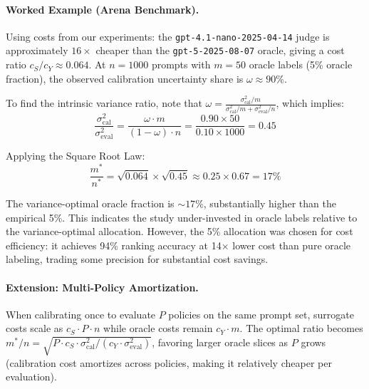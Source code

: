 \paragraph{Worked Example (Arena Benchmark).}
Using costs from our experiments: the \texttt{gpt-4.1-nano-2025-04-14} judge is approximately $16\times$ cheaper than the \texttt{gpt-5-2025-08-07} oracle, giving a cost ratio $c_S/c_Y \approx 0.064$. At $n=1000$ prompts with $m=50$ oracle labels (5\% oracle fraction), the observed calibration uncertainty share is $\omega \approx 90\%$.

To find the intrinsic variance ratio, note that $\omega = \frac{\sigma^2_{\mathrm{cal}}/m}{\sigma^2_{\mathrm{cal}}/m + \sigma^2_{\mathrm{eval}}/n}$, which implies:
\[
\frac{\sigma^2_{\mathrm{cal}}}{\sigma^2_{\mathrm{eval}}} = \frac{\omega \cdot m}{(1-\omega) \cdot n} = \frac{0.90 \times 50}{0.10 \times 1000} = 0.45
\]

Applying the Square Root Law:
\[
\frac{m^*}{n^*} = \sqrt{0.064} \times \sqrt{0.45} \approx 0.25 \times 0.67 = 17\%
\]

The variance-optimal oracle fraction is ${\sim}17\%$, substantially higher than the empirical 5\%. This indicates the study under-invested in oracle labels relative to the variance-optimal allocation. However, the 5\% allocation was chosen for cost efficiency: it achieves 94\% ranking accuracy at 14$\times$ lower cost than pure oracle labeling, trading some precision for substantial cost savings.

\paragraph{Extension: Multi-Policy Amortization.}
When calibrating once to evaluate $P$ policies on the same prompt set, surrogate costs scale as $c_S \cdot P \cdot n$ while oracle costs remain $c_Y \cdot m$. The optimal ratio becomes $m^*/n = \sqrt{P \cdot c_S \cdot \sigma^2_{\mathrm{cal}} / (c_Y \cdot \sigma^2_{\mathrm{eval}})}$, favoring larger oracle slices as $P$ grows (calibration cost amortizes across policies, making it relatively cheaper per evaluation).
